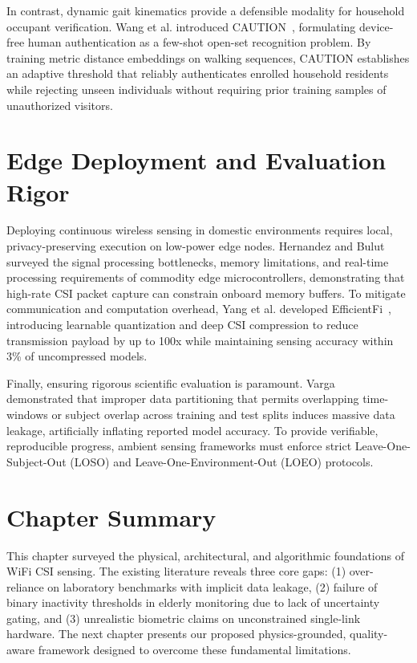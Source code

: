 In contrast, dynamic gait kinematics provide a defensible modality for household occupant verification. Wang et al. introduced CAUTION~\cite{author2022caution}, formulating device-free human authentication as a few-shot open-set recognition problem. By training metric distance embeddings on walking sequences, CAUTION establishes an adaptive threshold that reliably authenticates enrolled household residents while rejecting unseen individuals without requiring prior training samples of unauthorized visitors.

\section{Edge Deployment and Evaluation Rigor}
Deploying continuous wireless sensing in domestic environments requires local, privacy-preserving execution on low-power edge nodes. Hernandez and Bulut~\cite{hernandez2024wifi} surveyed the signal processing bottlenecks, memory limitations, and real-time processing requirements of commodity edge microcontrollers, demonstrating that high-rate CSI packet capture can constrain onboard memory buffers. To mitigate communication and computation overhead, Yang et al. developed EfficientFi~\cite{author2022efficientfi}, introducing learnable quantization and deep CSI compression to reduce transmission payload by up to 100x while maintaining sensing accuracy within 3\% of uncompressed models.

Finally, ensuring rigorous scientific evaluation is paramount. Varga~\cite{author2024mitigating} demonstrated that improper data partitioning that permits overlapping time-windows or subject overlap across training and test splits induces massive data leakage, artificially inflating reported model accuracy. To provide verifiable, reproducible progress, ambient sensing frameworks must enforce strict Leave-One-Subject-Out (LOSO) and Leave-One-Environment-Out (LOEO) protocols.

\section{Chapter Summary}
This chapter surveyed the physical, architectural, and algorithmic foundations of WiFi CSI sensing. The existing literature reveals three core gaps: (1) over-reliance on laboratory benchmarks with implicit data leakage, (2) failure of binary inactivity thresholds in elderly monitoring due to lack of uncertainty gating, and (3) unrealistic biometric claims on unconstrained single-link hardware. The next chapter presents our proposed physics-grounded, quality-aware framework designed to overcome these fundamental limitations.
